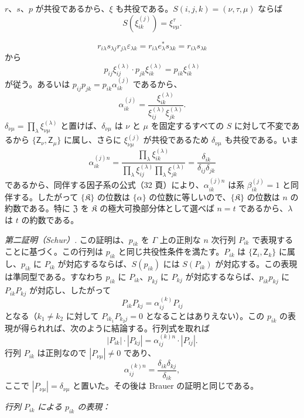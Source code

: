 \(r\)、\(s\)、\(p\) が共役であるから、\(\xi\) も共役である。\(S(i,j,k)=(\nu,\tau,\mu)\) ならば
\[
S(\xi_{ik}^{(j)})=\xi_{\nu\mu}^{\tau}.
\]

\[
r_{i\lambda}s_{\lambda j}r_{j\lambda}\varepsilon_{\lambda k}
=r_{i\lambda}e_\lambda^*s_{\lambda k}
=r_{i\lambda}s_{\lambda k}
\]
から
\[
p_{ij}\xi_{ij}^{(\lambda)}\cdot p_{jk}\xi_{ik}^{(\lambda)}
=p_{ik}\xi_{ik}^{(\lambda)}
\]
が従う。あるいは \(p_{ij}p_{jk}=p_{ik}\alpha_{ik}^{(j)}\) であるから、
\[
\alpha_{ik}^{(j)}
=\frac{\xi_{ik}^{(\lambda)}}{\xi_{ij}^{(\lambda)}\xi_{jk}^{(\lambda)}}.
\]
\(\delta_{\nu\mu}=\prod_\lambda\xi_{\nu\mu}^{(\lambda)}\) と置けば、\(\delta_{\nu\mu}\) は \(\nu\) と \(\mu\) を固定するすべての \(S\) に対して不変であるから \(\{\mathsf{Z}_\nu,\mathsf{Z}_\mu\}\) に属し、さらに \(\xi_{\nu\mu}^{(j)}\) が共役であるため \(\delta_{\nu\mu}\) も共役である。いま
\[
\alpha_{ik}^{(j)n}
=\frac{\prod_\lambda\xi_{ik}^{(\lambda)}}
       {\prod_\lambda\xi_{ij}^{(\lambda)}\prod_\lambda\xi_{jk}^{(\lambda)}}
=\frac{\delta_{ik}}{\delta_{ij}\delta_{jk}}
\]
であるから、同伴する因子系の公式（32 頁）により、\(\alpha_{ik}^{(j)n}\) は系 \(\beta_{ik}^{(j)}=1\) と同伴する。したがって \(\{\mathfrak K\}\) の位数は \(\{\alpha\}\) の位数に等しいので、\(\{\mathfrak K\}\) の位数は \(n\) の約数である。特に \(\mathfrak Z\) を \(\mathfrak K\) の極大可換部分体として選べば \(n=t\) であるから、\(\lambda\) は \(t\) の約数である。

\emph{第二証明（Schur）.} この証明は、\(p_{ik}\) を \(\Gamma\) 上の正則な \(n\) 次行列 \(P_{ik}\) で表現することに基づく。この行列は \(p_{ik}\) と同じ共役性条件を満たす。\(P_{ik}\) は \(\{\mathsf{Z}_i,\mathsf{Z}_k\}\) に属し、\(p_{ik}\) に \(P_{ik}\) が対応するならば、\(S(p_{ik})\) には \(S(P_{ik})\) が対応する。この表現は準同型である。すなわち \(p_{ik}\) に \(P_{ik}\)、\(p_{kj}\) に \(P_{kj}\) が対応するならば、\(p_{ik}p_{kj}\) に \(P_{ik}P_{kj}\) が対応し、したがって
\[
P_{ik}P_{kj}=\alpha_{ij}^{(k)}P_{ij}
\]
となる（\(k_1\ne k_2\) に対して \(P_{ik_1}P_{k_2j}=0\) となることはありえない）。この \(p_{ik}\) の表現が得られれば、次のように結論する。行列式を取れば
\[
|P_{ik}|\cdot |P_{kj}|=\alpha_{ij}^{(k)n}\cdot |P_{ij}|.
\]
行列 \(P_{ik}\) は正則なので \(|P_{\nu\mu}|\ne0\) であり、
\[
\alpha_{ij}^{(k)n}=\frac{\delta_{ik}\delta_{kj}}{\delta_{ik}},
\]
ここで \(|P_{\nu\mu}|=\delta_{\nu\mu}\) と置いた。その後は Brauer の証明と同じである。

\emph{行列 \(P_{ik}\) による \(p_{ik}\) の表現：}

